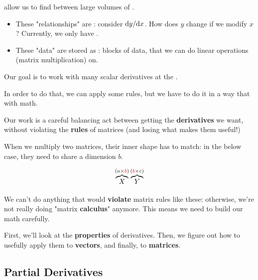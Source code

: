     \begin{concept}
         allow us to find  between large volumes of .
        
        \begin{itemize}
            \item These "relationships" are : consider ${\dd y}/{\dd x}$. How does $y$ change if we modify $x$? Currently, we only have .
            
            \item These "data" are stored as : blocks of data, that we can do linear operations (matrix multiplication) on.
        \end{itemize}
        
        Our goal is to work with many scalar derivatives at the . 
        
        In order to do that, we can apply some  rules, but we have to do it in a way that  with  math.
    \end{concept}
    
    Our work is a careful balancing act between getting the \textbf{derivatives} we want, without violating the \textbf{rules} of matrices (and losing what makes them useful!)
    
    \miniex When we multiply two matrices, their inner shape has to match: in the below case, they need to share a dimension $b$.
    
    \begin{equation}
        \overbrace{
            X
        }^{ (a \times \textcolor{red}{b}) }
        \overbrace{
            Y
        }^{(\textcolor{red}{b} \times c)}
    \end{equation}
    
    We can't do anything that would \textbf{violate} matrix rules like these: otherwise, we're not really doing "matrix \textbf{calculus}" anymore. This means we need to build our math carefully.
    
    First, we'll look at the \textbf{properties} of derivatives. Then, we figure out how to usefully apply them to \textbf{vectors}, and finally, to \textbf{matrices}.
    
    \secdiv
    
    \subsection{\quad Partial Derivatives}
    
